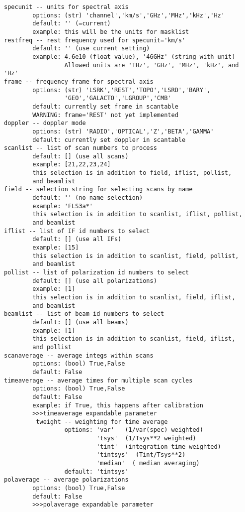 \begin{verbatim}
specunit -- units for spectral axis
        options: (str) 'channel','km/s','GHz','MHz','kHz','Hz'
        default: '' (=current)
        example: this will be the units for masklist
restfreq -- rest frequency used for specunit='km/s'
        default: '' (use current setting)
        example: 4.6e10 (float value), '46GHz' (string with unit)
                 Allowed units are 'THz', 'GHz', 'MHz', 'kHz', and 'Hz'
frame -- frequency frame for spectral axis
        options: (str) 'LSRK','REST','TOPO','LSRD','BARY',
                 'GEO','GALACTO','LGROUP','CMB'
        default: currently set frame in scantable
        WARNING: frame='REST' not yet implemented
doppler -- doppler mode
        options: (str) 'RADIO','OPTICAL','Z','BETA','GAMMA'
        default: currently set doppler in scantable
scanlist -- list of scan numbers to process
        default: [] (use all scans)
        example: [21,22,23,24]
        this selection is in addition to field, iflist, pollist,
        and beamlist
field -- selection string for selecting scans by name
        default: '' (no name selection)
        example: 'FLS3a*'
        this selection is in addition to scanlist, iflist, pollist,
        and beamlist
iflist -- list of IF id numbers to select
        default: [] (use all IFs)
        example: [15]
        this selection is in addition to scanlist, field, pollist,
        and beamlist
pollist -- list of polarization id numbers to select
        default: [] (use all polarizations)
        example: [1]
        this selection is in addition to scanlist, field, iflist,
        and beamlist
beamlist -- list of beam id numbers to select
        default: [] (use all beams)
        example: [1]
        this selection is in addition to scanlist, field, iflist,
        and pollist
scanaverage -- average integs within scans
        options: (bool) True,False
        default: False
timeaverage -- average times for multiple scan cycles
        options: (bool) True,False
        default: False
        example: if True, this happens after calibration
        >>>timeaverage expandable parameter
         tweight -- weighting for time average
                 options: 'var'   (1/var(spec) weighted)
                          'tsys'  (1/Tsys**2 weighted)
                          'tint'  (integration time weighted)
                          'tintsys'  (Tint/Tsys**2)
                          'median'  ( median averaging)
                 default: 'tintsys'
polaverage -- average polarizations
        options: (bool) True,False
        default: False
        >>>polaverage expandable parameter

\end{verbatim}

